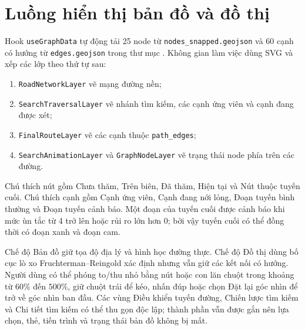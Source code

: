 \section{Luồng hiển thị bản đồ và đồ thị}

Hook \texttt{useGraphData} tự động tải 25 node từ
\texttt{nodes\_snapped.geojson} và 60 cạnh có hướng từ
\texttt{edges.geojson} trong thư mục
. Không gian làm việc dùng SVG và xếp các
lớp theo thứ tự sau:

\begin{enumerate}[itemsep=2pt]
  \item \texttt{RoadNetworkLayer} vẽ mạng đường nền;
  \item \texttt{SearchTraversalLayer} vẽ nhánh tìm kiếm, các cạnh ứng viên và
  cạnh đang được xét;
  \item \texttt{FinalRouteLayer} vẽ các cạnh thuộc \texttt{path\_edges};
  \item \texttt{SearchAnimationLayer} và \texttt{GraphNodeLayer} vẽ trạng thái
  node phía trên các đường.
\end{enumerate}

Chú thích nút gồm Chưa thăm, Trên biên, Đã thăm, Hiện tại và Nút thuộc tuyến cuối.
Chú thích cạnh gồm Cạnh ứng viên, Cạnh đang nới lỏng, Đoạn tuyến bình thường và
Đoạn tuyến cảnh báo. Một đoạn của tuyến cuối được cảnh báo khi mức ùn tắc từ
4 trở lên hoặc rủi ro lớn hơn 0; bởi vậy tuyến cuối có thể đồng thời có đoạn xanh
và đoạn cam.

Chế độ Bản đồ giữ tọa độ địa lý và hình học đường thực. Chế độ Đồ thị dùng bố
cục lò xo Fruchterman--Reingold xác định nhưng vẫn giữ các kết nối có hướng. Người
dùng có thể phóng to/thu nhỏ bằng nút hoặc con lăn chuột trong khoảng từ
$60\%$ đến $500\%$, giữ chuột trái để kéo, nhấn đúp hoặc chọn Đặt lại góc nhìn
để trở về góc nhìn ban đầu. Các vùng Điều khiển tuyến đường, Chiến lược tìm kiếm
và Chi tiết tìm kiếm có thể thu gọn độc lập; thành phần vẫn được gắn nên lựa
chọn, thẻ, tiến trình và trạng thái bản đồ không bị mất.
